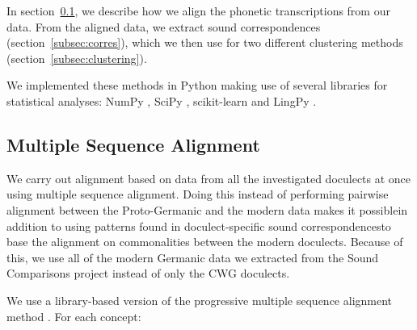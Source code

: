 \documentclass[a4paper]{article}
\begin{document}
In section~\ref{subsec:msa}, we describe how we align
the phonetic transcriptions from our data.
From the aligned data, we extract sound correspondences
(section~\ref{subsec:corres}), which we then use for
two different clustering methods (section~\ref{subsec:clustering}).

We implemented these methods in Python
making use of several libraries for statistical analyses:
NumPy \citep{oliphant2006guide}, SciPy \citep{jones2001scipy},
scikit-learn \citep{pedregosa2011scikit-learn} and LingPy \citep{list2018lingpy}.

\subsection{Multiple Sequence Alignment}
\label{subsec:msa}

We carry out alignment based on data from
all the investigated doculects at once using multiple sequence alignment.
Doing this instead of performing pairwise alignment between
the Proto-Germanic and the modern data makes it possible\textemdash{}in addition to using patterns found in doculect-specific
sound correspondences\textemdash{}to base the alignment on commonalities
between the modern doculects.
Because of this, we use all of the modern Germanic data
we extracted from the Sound Comparisons project
instead of only the CWG doculects.

We use a library-based version \citep{notredame2000t-coffee:} of the progressive multiple sequence alignment method \citep{thompson1994clustal}.
For each concept:
\end{document}
